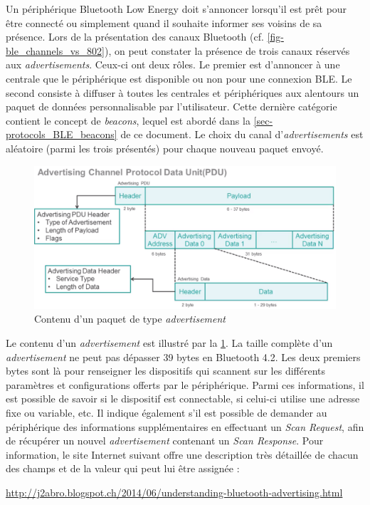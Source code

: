 Un périphérique Bluetooth Low Energy doit s'annoncer lorsqu'il est prêt pour être connecté ou simplement quand il souhaite informer ses voisins de sa présence. Lors de la présentation des canaux Bluetooth (cf. \cref{fig-ble_channels_vs_802}), on peut constater la présence de trois canaux réservés aux \textit{advertisements}. Ceux-ci ont deux rôles. Le premier est d'annoncer à une centrale que le périphérique est disponible ou non pour une connexion BLE. Le second consiste à diffuser à toutes les centrales et périphériques aux alentours un paquet de données personnalisable par l'utilisateur. Cette dernière catégorie contient le concept de \textit{beacons}, lequel est abordé dans la \cref{sec-protocols_BLE_beacons} de ce document. Le choix du canal d'\textit{advertisements} est aléatoire (parmi les trois présentés) pour chaque nouveau paquet envoyé. \\

\begin{figure}[ht!]
    \centering
    \includegraphics[width=1.0\textwidth]{Figures/Protocols/Bluetooth/ble_adv_packet_content.PNG}
    \caption{Contenu d'un paquet de type \textit{advertisement}}
    \label{fig-ble_adv_packet_content}
\end{figure}

Le contenu d'un \textit{advertisement} est illustré par la \cref{fig-ble_adv_packet_content}. La taille complète d'un \textit{advertisement} ne peut pas dépasser 39 bytes en Bluetooth 4.2. Les deux premiers bytes sont là pour renseigner les dispositifs qui scannent sur les différents paramètres et configurations offerts par le périphérique. Parmi ces informations, il est possible de savoir si le dispositif est connectable, si celui-ci utilise une adresse fixe ou variable, etc. Il indique également s’il est possible de demander au périphérique des informations supplémentaires en effectuant un \textit{Scan Request}, afin de récupérer un nouvel \textit{advertisement} contenant un \textit{Scan Response}. Pour information, le site Internet suivant offre une description très détaillée de chacun des champs et de la valeur qui peut lui être assignée : 
\begin{center}
    \small{\url{http://j2abro.blogspot.ch/2014/06/understanding-bluetooth-advertising.html}}
\end{center}

